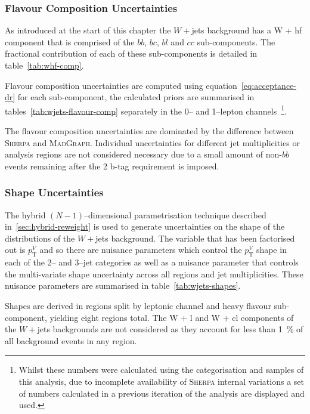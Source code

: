 \subsubsection{Flavour Composition Uncertainties}

As introduced at the start of this chapter the $W+$jets background has a W + hf
component that is comprised of the $bb$, $bc$, $bl$ and $cc$ sub-components. The
fractional contribution of each of these sub-components is detailed in
table~\ref{tab:whf-comp}.

Flavour composition uncertainties are computed using
equation~\ref{eq:acceptance-dr} for each sub-component, the calculated priors
are summarised in tables~\ref{tab:wjets-flavour-comp} separately in the 0-- and
1--lepton channels~\footnote{Whilst these numbers were calculated using the
  categorisation and samples of this analysis, due to incomplete availability of
  \textsc{Sherpa} internal variations a set of numbers calculated in a previous
  iteration of the analysis are displayed and used.}.

The flavour composition uncertainties are dominated by the difference between
\textsc{Sherpa} and \textsc{MadGraph}. Individual uncertainties for different
jet multiplicities or analysis regions are not considered necessary due to a
small amount of non-$bb$ events remaining after the 2 b-tag requirement is
imposed.

\subsubsection{Shape Uncertainties}

The hybrid $(N-1)$--dimensional parametrisation technique described
in~\ref{sec:hybrid-reweight} is used to generate uncertainties on the shape of
the distributions of the $W+$jets background. The variable that has been
factorised out is $p_{\mathrm{T}}^V$ and so there are nuisance parameters which control the
$p_{\mathrm{T}}^V$ shape in each of the 2-- and 3--jet categories as well as a nuisance
parameter that controls the multi-variate shape uncertainty across all regions
and jet multiplicities. These nuisance parameters are summarised in
table~\ref{tab:wjets-shapes}.


Shapes are derived in regions split by leptonic channel and heavy flavour
sub-component, yielding eight regions total. The W + l and W + cl components of
the $W+$jets backgrounds are not considered as they account for less than 1~\%
of all background events in any region.

